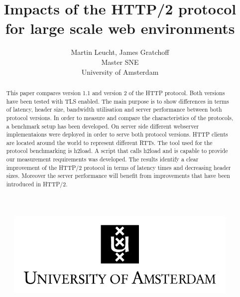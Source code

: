 \documentclass[10pt]{article}
\begin{document}
 
\begin{figure}[!bh]
 	\begin{center}
 	 
 		\huge \title{Impacts of the HTTP/2 protocol for large scale web environments}
		\author{Martin Leucht, James Gratchoff \\
		Master SNE \\ University of Amsterdam} 
		\includegraphics{images/uva.jpeg}
	\maketitle 
		\label{sec:uva}
	\end{center}
\end{figure}
\setlength{\columnsep}{2cm}
\def\columnseprulecolor{\color{blue}}
 
\newpage
\begin{abstract}
This paper compares version 1.1 and version 2 of the HTTP protocol. Both versions have been tested with TLS enabled. The main purpose is to show differences in terms of latency, header size, bandwidth utilisation and server performance between both protocol versions. In order to measure and compare the characteristics of the protocols, a benchmark setup has been developed. On server side different webserver implementaions were deployed in order to serve both protocol versions. HTTP clients are located around the world to represent different RTTs. The tool used for the protocol benchmarking is h2load. A script that calls h2load and is capable to provide our measurement requirements was developed. The results identify a clear improvement of the HTTP/2 protocol in terms of latency times and decreasing header sizes. Moreover the server performance will benefit from improvements that have been introduced in HTTP/2.
\end{abstract}

\newpage
\tableofcontents

\newpage
\newpage







\newpage




\newpage

\newpage

\newpage

\newpage

\end{document}
